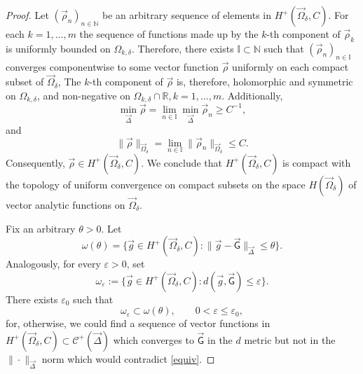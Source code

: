 \documentclass{amsart}
\numberwithin{equation}{section}
\theoremstyle{definition}
\begin{document}
\begin{proof}


 	
 Let $(\vec{\rho}_n )_{n \in \mathbb{N}}$ be an arbitrary sequence of elements in $ H^+(\vec{\Omega}_{\delta}, C)$. For each $k = 1,\ldots,m$  the sequence of functions made up by  the $k$-th component of $\vec{\rho}_k$ is uniformly bounded on $\Omega_{k,\delta}$. Therefore, there exists  $\mathbb{I} \subset \mathbb{N}$ such that $(\vec{\rho}_n)_{n \in \mathbb{I}}$ converges componentwise to some vector function $\vec{\rho}$ uniformly on each compact subset of $\vec{\Omega}_{\delta} $, The $k$-th component of $\vec{\rho}$ is, therefore, holomorphic and symmetric on $\Omega_{k,\delta}$, and non-negative on $\Omega_{k,\delta}\cap \mathbb{R}, k=1,\ldots,m$. Additionally,
 	\[
 	\min_{  \vec{\Delta}} \vec{\rho} = \lim_{n \in \mathbb{I}} \min_{\vec{\Delta}} \vec{\rho}_n \geq C^{-1},	
 	\]
 	and
 	\[
 	 \|\vec{\rho}\|_{\vec{\Omega}_{\delta}} = \lim_{n\in \mathbb{I}} \|\vec{\rho}_n\|_{\vec{\Omega}_{\delta}} \leq C.
 	\]
 	Consequently, $\vec{\rho} \in H^+(\vec{\Omega}_{\delta},C)$. We conclude that $H^+(\vec{\Omega}_{\delta},C)$ is compact with the topology of uniform convergence on compact subsets on the space $H(\vec{\Omega}_{\delta})$ of vector analytic functions on $\vec{\Omega}_{\delta}$.

 	Fix an arbitrary $\theta > 0$. Let
 	\[
 	\omega(\theta)= \{ \vec{g} \in H^+(\vec{\Omega}_{\delta}, C):\|\vec{g} - \vec{\mathsf{G}}\|_{\vec{\Delta}}\leq \theta \}.
 	\]
  Analogously, for every $\varepsilon > 0$, set
 	\[
 	\omega_\varepsilon := \{ \vec{g}\in H^+(\vec{\Omega}_{\delta}, C) : d(\vec{g},\vec{\mathsf{G}}) \leq \varepsilon\}.
 	\]
 	There exists $\varepsilon_0$ such that
 	\[
 	\omega_{\varepsilon} \subset \omega(\theta), \qquad 0 < \varepsilon \leq \varepsilon_0,
 	\]
 	for, otherwise, we could find a sequence of vector functions in $H^+(\vec{\Omega}_{\delta}, C) \subset \mathcal{C}^+(\vec{\Delta})$ which converges to $\vec{\mathsf{G}}$ in the $d$ metric but not in the $\|\cdot\|_{ \vec{\Delta}}$ norm which would contradict \eqref{equiv}.
 	

\end{proof}
\end{document}
